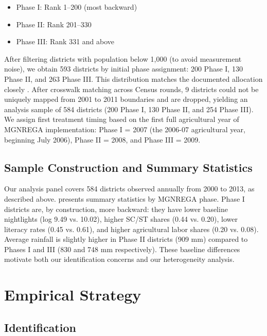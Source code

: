 \documentclass[12pt]{article}
\begin{document}
\begin{itemize}
  \item Phase I: Rank 1--200 (most backward)
  \item Phase II: Rank 201--330
  \item Phase III: Rank 331 and above
\end{itemize}

After filtering districts with population below 1,000 (to avoid measurement noise), we obtain 593 districts by initial phase assignment: 200 Phase I, 130 Phase II, and 263 Phase III. This distribution matches the documented allocation closely \citep{dreze2011employment}. After crosswalk matching across Census rounds, 9 districts could not be uniquely mapped from 2001 to 2011 boundaries and are dropped, yielding an analysis sample of 584 districts (200 Phase I, 130 Phase II, and 254 Phase III). We assign first treatment timing based on the first full agricultural year of MGNREGA implementation: Phase I = 2007 (the 2006-07 agricultural year, beginning July 2006), Phase II = 2008, and Phase III = 2009.

\subsection{Sample Construction and Summary Statistics}

Our analysis panel covers 584 districts observed annually from 2000 to 2013, as described above.  presents summary statistics by MGNREGA phase. Phase I districts are, by construction, more backward: they have lower baseline nightlights (log 9.49 vs. 10.02), higher SC/ST shares (0.44 vs. 0.20), lower literacy rates (0.45 vs. 0.61), and higher agricultural labor shares (0.20 vs. 0.08). Average rainfall is slightly higher in Phase II districts (909 mm) compared to Phases I and III (830 and 748 mm respectively). These baseline differences motivate both our identification concerns and our heterogeneity analysis.




\section{Empirical Strategy}

\subsection{Identification}
\end{document}
